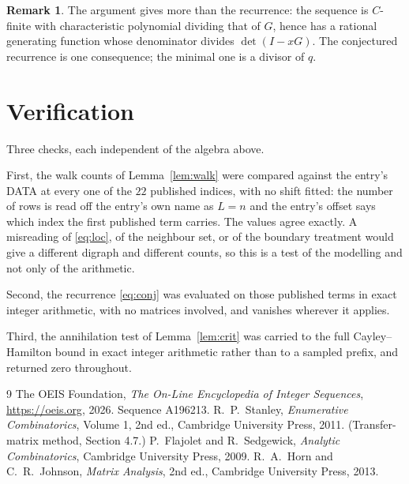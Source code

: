 \documentclass[11pt,a4paper]{article}
\theoremstyle{plain}
\theoremstyle{definition}
\newtheorem{remark}[theorem]{Remark}
\begin{document}
\begin{remark}
The argument gives more than the recurrence: the sequence is $C$-finite with characteristic
polynomial dividing that of $G$, hence has a rational generating function whose denominator
divides $\det(I-xG)$. The conjectured recurrence is one consequence; the minimal one is a
divisor of $q$.
\end{remark}

\section{Verification}

Three checks, each independent of the algebra above.

First, the walk counts of Lemma~\ref{lem:walk} were compared against the entry's DATA at
every one of the $22$ published indices, with no shift fitted: the number of rows is
read off the entry's own name as $L=n$ and the entry's offset says which index the first
published term carries. The values agree exactly. A misreading of \eqref{eq:loc}, of the
neighbour set, or of the boundary treatment would give a different digraph and different
counts, so this is a test of the modelling and not only of the arithmetic.

Second, the recurrence \eqref{eq:conj} was evaluated on those published terms in exact
integer arithmetic, with no matrices involved, and vanishes wherever it applies.

Third, the annihilation test of Lemma~\ref{lem:crit} was carried to the full
Cayley--Hamilton bound in exact integer arithmetic rather than to a sampled prefix, and
returned zero throughout.

\begin{thebibliography}{9}
 The OEIS Foundation, \emph{The On-Line Encyclopedia of Integer
Sequences}, \url{https://oeis.org}, 2026. Sequence A196213.
 R.~P.~Stanley, \emph{Enumerative Combinatorics}, Volume 1, 2nd ed.,
Cambridge University Press, 2011. (Transfer-matrix method, Section 4.7.)
 P.~Flajolet and R.~Sedgewick, \emph{Analytic Combinatorics}, Cambridge
University Press, 2009.
 R.~A.~Horn and C.~R.~Johnson, \emph{Matrix Analysis}, 2nd ed., Cambridge
University Press, 2013.
\end{thebibliography}
\end{document}
